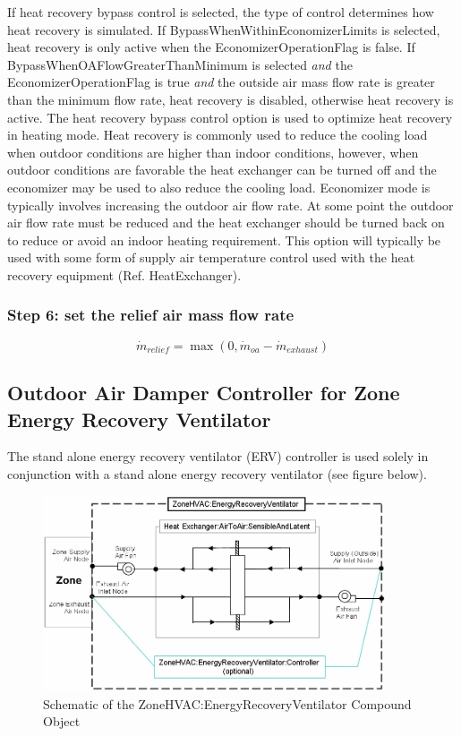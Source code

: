 If heat recovery bypass control is selected, the type of control determines how heat recovery is simulated. If BypassWhenWithinEconomizerLimits is selected, heat recovery is only active when the EconomizerOperationFlag is false. If BypassWhenOAFlowGreaterThanMinimum is selected \emph{and} the EconomizerOperationFlag is true \emph{and} the outside air mass flow rate is greater than the minimum flow rate, heat recovery is disabled, otherwise heat recovery is active. The heat recovery bypass control option is used to optimize heat recovery in heating mode. Heat recovery is commonly used to reduce the cooling load when outdoor conditions are higher than indoor conditions, however, when outdoor conditions are favorable the heat exchanger can be turned off and the economizer may be used to also reduce the cooling load. Economizer mode is typically involves increasing the outdoor air flow rate. At some point the outdoor air flow rate must be reduced and the heat exchanger should be turned back on to reduce or avoid an indoor heating requirement. This option will typically be used with some form of supply air temperature control used with the heat recovery equipment (Ref. HeatExchanger).

\subsubsection{Step 6: set the relief air mass flow rate}\label{step-6-set-the-relief-air-mass-flow-rate}

\begin{equation}
{\dot m_{relief}} = \max (0,{\dot m_{oa}} - {\dot m_{exhaust}})
\end{equation}

\subsection{Outdoor Air Damper Controller for Zone Energy Recovery Ventilator}\label{outdoor-air-damper-controller-for-zone-energy-recovery-ventilator}

The stand alone energy recovery ventilator (ERV) controller is used solely in conjunction with a stand alone energy recovery ventilator (see figure below).

\begin{figure}[hbtp] %
\centering
\includegraphics[width=0.9\textwidth, height=0.9\textheight, keepaspectratio=true]{media/image4482.png}
\caption{Schematic of the ZoneHVAC:EnergyRecoveryVentilator Compound Object \protect \label{fig:schematic-of-the-zonehvac}}
\end{figure}

